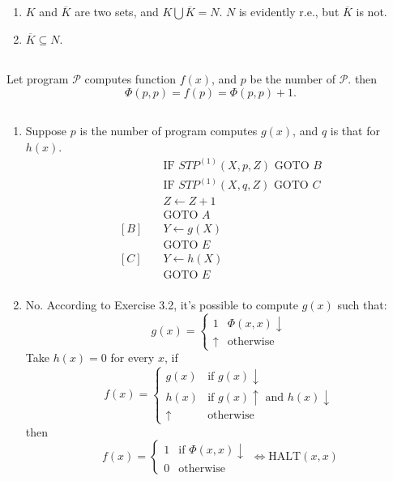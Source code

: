 \subsection{}
\begin{enumerate}
  \item 
    $K$ and $\overline{K}$ are two sets,
    and $ K \bigcup \overline{K} = N $. $N$ is evidently r.e.,
    but $ \overline{K} $ is not.

  \item 
    $ \overline{K} \subseteq N $.
\end{enumerate}

\subsection{}
Let program $\mathscr{P}$ computes function $ f(x) $,
and $p$ be the number of $\mathscr{P}$. then
\[ \Phi(p,p) = f(p) = \Phi(p, p) + 1. \]


\subsection{}
\begin{enumerate}
  \item 
  Suppose $p$ is the number of program computes $g(x)$, and $q$ is
  that for $h(x)$.
  \begin{align*}
    [A]\quad & \text{IF } STP^{(1)}(X,p,Z) \text{ GOTO } B \\
         & \text{IF } STP^{(1)}(X,q,Z) \text{ GOTO } C \\
         & Z \gets Z + 1 \\
         & \text{GOTO } A \\
    [B]\quad & Y \gets g(X) \\
         & \text{GOTO } E \\
    [C]\quad & Y \gets h(X) \\
         & \text{GOTO } E \\
  \end{align*}
  
  \item 
  No. According to Exercise 3.2, it's possible to compute $g(x)$ such that:
  \[ g(x) = 
     \begin{cases}
       1        & \Phi(x,x) \downarrow \\
       \uparrow & \text{otherwise}
     \end{cases} \]
  Take $ h(x) = 0 $ for every $x$, if
  \[ f(x) =
     \begin{cases}
       g(x)    & \text{if } g(x) \downarrow \\
       h(x)     & \text{if } g(x) \uparrow \text{ and } h(x) \downarrow \\
       \uparrow & \text{otherwise}
     \end{cases} \]
  then
  \[ f(x) = 
     \begin{cases}
       1 & \text{if } \Phi(x,x) \downarrow \\
       0 & \text{otherwise}
     \end{cases}
     \Leftrightarrow \mathrm{HALT}(x,x) \]
\end{enumerate}



